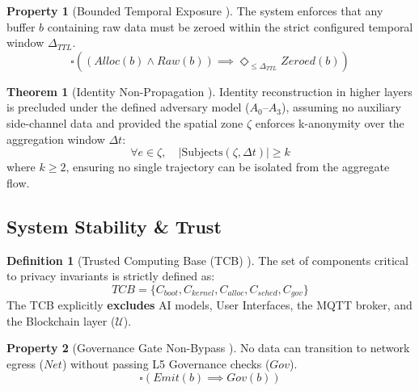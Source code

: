 \documentclass[conference]{IEEEtran}
\theoremstyle{definition}
\newtheorem{definition}{Definition}
\newtheorem{theorem}{Theorem}
\newtheorem{property}{Property}
\begin{document}
\begin{property}[Bounded Temporal Exposure \cite{P19}]
The system enforces that any buffer $b$ containing raw data must be zeroed within the strict configured temporal window $\Delta_{TTL}$.
\begin{equation}
\square \left( (Alloc(b) \land Raw(b)) \implies \Diamond_{\le \Delta_{TTL}} Zeroed(b) \right)
\end{equation}
\end{property}

\begin{theorem}[Identity Non-Propagation \cite{P9}]
Identity reconstruction in higher layers is precluded under the defined adversary model ($A_0$--$A_3$), assuming no auxiliary side-channel data and provided the spatial zone $\zeta$ enforces k-anonymity over the aggregation window $\Delta t$:
\begin{equation}
\forall e \in \zeta, \quad |\text{Subjects}(\zeta, \Delta t)| \ge k
\end{equation}
where $k \ge 2$, ensuring no single trajectory can be isolated from the aggregate flow.
\end{theorem}

\subsection{System Stability \& Trust}

\begin{definition}[Trusted Computing Base (TCB) \cite{P19}]
The set of components critical to privacy invariants is strictly defined as:
\begin{equation}
TCB = \{ C_{boot}, C_{kernel}, C_{alloc}, C_{sched}, C_{gov} \}
\end{equation}
The TCB explicitly \textbf{excludes} AI models, User Interfaces, the MQTT broker, and the Blockchain layer ($\mathcal{U}$).
\end{definition}

\begin{property}[Governance Gate Non-Bypass \cite{P9}]
No data can transition to network egress ($Net$) without passing L5 Governance checks ($Gov$).
\begin{equation}
\square \left( Emit(b) \implies Gov(b) \right)
\end{equation}
\end{property}
\end{document}
